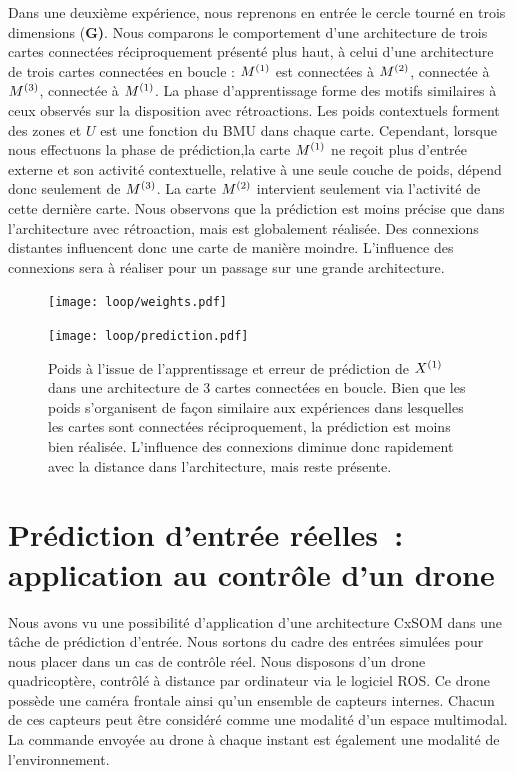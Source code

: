 \documentclass[../main]{subfiles}
\begin{document}
Dans une deuxième expérience, nous reprenons en entrée le cercle tourné en trois dimensions (\textbf{G)}. Nous comparons le comportement d'une architecture de trois cartes connectées réciproquement présenté plus haut, à celui d'une architecture de trois cartes connectées en boucle : $M^{({1})}$ est connectées à $M^{({2})}$, connectée à $M^{({3})}$, connectée à $M^{({1})}$. 
La phase d'apprentissage forme des motifs similaires à ceux observés sur la disposition avec rétroactions. Les poids contextuels forment des zones et $U$ est une fonction du BMU dans chaque carte. 
Cependant, lorsque nous effectuons la phase de prédiction,la carte $M^{({1})}$ ne reçoit plus d'entrée externe et son activité contextuelle, relative à une seule couche de poids, dépend donc seulement de $M^{({3})}$. La carte $M^{({2})}$ intervient seulement via l'activité de cette dernière carte.
Nous observons que la prédiction est moins précise que dans l'architecture avec rétroaction, mais est globalement réalisée. Des connexions distantes influencent donc une carte de manière moindre. L'influence des connexions sera à réaliser pour un passage sur une grande architecture.

\begin{figure}[h!]
	\begin{minipage}{\textwidth}
		\centering\texttt{[image: loop/weights.pdf]}
	\end{minipage}
	\begin{minipage}{\textwidth}
		\centering\texttt{[image: loop/prediction.pdf]}
		\caption{Poids à l'issue de l'apprentissage et erreur de prédiction de $X^{({1})}$ dans une architecture de 3 cartes connectées en boucle. Bien que les poids s'organisent de façon similaire aux expériences dans lesquelles les cartes sont connectées réciproquement, la prédiction est moins bien réalisée. L'influence des connexions diminue donc rapidement avec la distance dans l'architecture, mais reste présente.\label{fig:3som_loop}}
	\end{minipage}
\end{figure}

	
\section{Prédiction d'entrée réelles~: application au contrôle d'un drone}

Nous avons vu une possibilité d'application d'une architecture CxSOM dans une tâche de prédiction d'entrée. Nous sortons du cadre des entrées simulées pour nous placer dans un cas de contrôle réel. 
Nous disposons d'un drone quadricoptère, contrôlé à distance par ordinateur via le logiciel ROS.
Ce drone possède une caméra frontale ainsi qu'un ensemble de capteurs internes. Chacun de ces capteurs peut être considéré comme une modalité d'un espace multimodal. 
La commande envoyée au drone à chaque instant est également une modalité de l'environnement.
\end{document}
